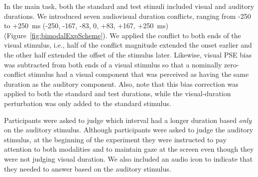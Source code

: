 \documentclass[9pt,lineno,doublespacing]{elife}
\begin{document}

In the main task, both the standard and test stimuli included visual and auditory durations. We introduced seven audiovisual duration conflicts, ranging from -250 to +250~ms (-250, -167, -83, 0, +83, +167, +250~ms) (Figure~\ref{fig:bimodalExpScheme}). We applied the conflict to both ends of the visual stimulus, i.e., half of the conflict magnitude extended the onset earlier and the other half extended the offset of the stimulus later. Likewise, visual PSE bias was subtracted from both ends of a visual stimulus so that a nominally zero-conflict stimulus had a visual component that was perceived as having the same duration as the auditory component. Also, note that this bias correction was applied to both the standard and test durations, while the visual-duration perturbation was only added to the standard stimulus.


Participants were asked to judge which interval had a longer duration based {\em only} on the auditory stimulus. Although participants were asked to judge the auditory stimulus, at the beginning of the experiment they were instructed to pay attention to both modalities and to maintain gaze at the screen even though they were not judging visual duration. We also included an audio icon to indicate that they needed to answer based on the auditory stimulus.


\end{document}
